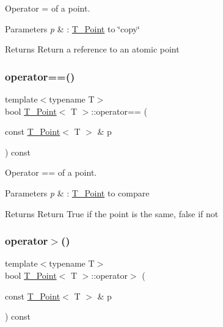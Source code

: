 Operator = of a point. 


\begin{DoxyParams}{Parameters}
{\em p} & \+: \hyperlink{classT__Point}{T\+\_\+\+Point} to \char`\"{}copy\char`\"{} \\
\hline
\end{DoxyParams}
\begin{DoxyReturn}{Returns}
Return a reference to an atomic point 
\end{DoxyReturn}
\mbox{\label{classT__Point_a83c15f53049523cc75c23350ceb4832a}} 
\subsubsection{\texorpdfstring{operator==()}{operator==()}}
{\footnotesize\ttfamily template$<$typename T$>$ \\
bool \hyperlink{classT__Point}{T\+\_\+\+Point}$<$ T $>$\+::operator== (\begin{DoxyParamCaption}\item[{const \hyperlink{classT__Point}{T\+\_\+\+Point}$<$ T $>$ \&}]{p }\end{DoxyParamCaption}) const\hspace{0.3cm}{\ttfamily [inline]}}



Operator == of a point. 


\begin{DoxyParams}{Parameters}
{\em p} & \+: \hyperlink{classT__Point}{T\+\_\+\+Point} to compare \\
\hline
\end{DoxyParams}
\begin{DoxyReturn}{Returns}
Return True if the point is the same, false if not 
\end{DoxyReturn}
\mbox{\label{classT__Point_a0a9956de8ab7c8dccf35b78c43aedefd}} 
\subsubsection{\texorpdfstring{operator$>$()}{operator>()}}
{\footnotesize\ttfamily template$<$typename T$>$ \\
bool \hyperlink{classT__Point}{T\+\_\+\+Point}$<$ T $>$\+::operator$>$ (\begin{DoxyParamCaption}\item[{const \hyperlink{classT__Point}{T\+\_\+\+Point}$<$ T $>$ \&}]{p }\end{DoxyParamCaption}) const\hspace{0.3cm}{\ttfamily [inline]}}



